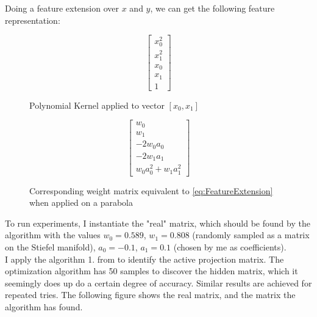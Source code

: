 Doing a feature extension over $x$ and $y$, we can get the following feature representation:

\def\PHI{
\begin{bmatrix}
	x_0^2 \\
	x_1^2 \\
	x_0 \\
	x_1 \\
    1
\end{bmatrix}}


\def\WtoPhi{
\begin{bmatrix}
	w_0 \\
    w_1 \\
	-2 w_0 a_0 \\
	-2 w_1 a_1 \\
	w_0 a_0^2 + w_1 a_1^2
\end{bmatrix}}

\begin{figure}[h]

\begin {minipage}{0.47\textwidth}
  \centering
  \begin{equation}
    \PHI
  \end{equation}
  \caption{Polynomial Kernel applied to vector $[x_0, x_1]$}
\end{minipage}
\hfill
\begin {minipage}{0.47\textwidth}
  \centering
  \begin{equation}
    \WtoPhi
  \end{equation}
  \caption{Corresponding weight matrix equivalent to \ref{eq:FeatureExtension} when applied on a parabola}
\end{minipage}

\end{figure}

To run experiments, I instantiate the "real" matrix, which should be found by the algorithm with the values $w_0 = 0.589$, $w_1 = 0.808$ (randomly sampled as a matrix on the Stiefel manifold), $a_0 = -0.1$, $a_1 = 0.1$ (chosen by me as coefficients). \\

I apply the algorithm 1. from \citep{Tripathy} to identify the active projection matrix.
The optimization algorithm has 50 samples to discover the hidden matrix, which it seemingly does up do a certain degree of accuracy.
Similar results are achieved for repeated tries.
The following figure shows the real matrix, and the matrix the algorithm has found.

\def\realW{
\begin{bmatrix}
	0.589 \\
    0.808 \\
	0.118 \\
	-0.162 \\
	0.823
\end{bmatrix}}

